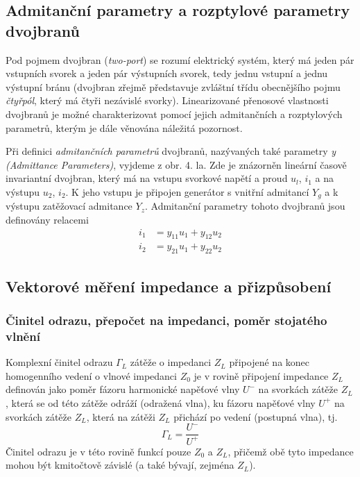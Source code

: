     \subsection{Admitanční parametry a rozptylové parametry dvojbranů}
      Pod pojmem dvojbran (\emph{two-port}) se rozumí elektrický systém, který má jeden pár vstupních svorek 
      a jeden pár výstupních svorek, tedy jednu vstupní a jednu výstupní bránu (dvojbran zřejmě představuje 
      zvláštní třídu obecnějšího pojmu \emph{čtyřpól}, který má čtyři nezávislé svorky). Linearizované 
      přenosové vlastnosti dvojbranů je možné charakterizovat pomocí jejich admitančních a rozptylových 
      parametrů, kterým je dále věnována náležitá pozornost.
      
      Při definici \emph{admitančních parametrů} dvojbranů, nazývaných také parametry \emph{y (Admittance 
      Parameters)}, vyjdeme z obr. 4. la. Zde je znázorněn lineární časově invariantní dvojbran, který má na 
      vstupu svorkové napětí a proud \(u_l\), \(i_1\) a na výstupu \(u_2\), \(i_2\). K jeho vstupu je 
      připojen generátor s vnitřní admitancí \(Y_g\) a k výstupu zatěžovací admitance \(Y_z\). Admitanční 
      parametry tohoto dvojbranů jsou definovány relacemi
      \begin{align}
        i_1 &= y_{11}u_1 + y_{12}u_2   \\ 
        i_2 &= y_{21}u_1 + y_{22}u_2    
      \end{align}
  
    \subsection{Vektorové měření impedance a přizpůsobení}
      \subsubsection{Činitel odrazu, přepočet na impedanci, poměr stojatého vlnění}
        Komplexní činitel odrazu \(\Gamma_L\) zátěže o impedanci \(Z_L\) připojené na konec homogenního 
        vedení o vlnové impedanci \(Z_0\) je v rovině připojení impedance \(Z_L\) definován jako poměr fázoru 
        harmonické napěťové vlny \(U^-\) na svorkách zátěže \(Z_L\), která se od této zátěže odráží (odražená 
        vlna), ku fázoru napěťové vlny \(U^+\) na svorkách zátěže \(Z_L\), která na zátěži \(Z_L\) přichází 
        po vedení (postupná vlna), tj.
        \begin{equation}\label{RA:eq_smith01}
          \Gamma_L = \frac{U^-}{U^+}
        \end{equation}
        Činitel odrazu je v této rovině funkcí pouze \(Z_0\) a \(Z_L\), přičemž obě tyto impedance mohou být 
        kmitočtově závislé (a také bývají, zejména \(Z_L\)).
  
